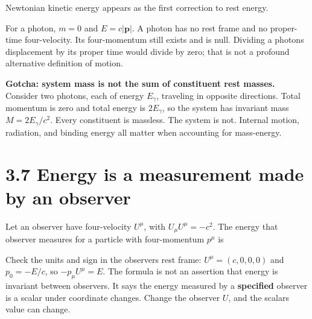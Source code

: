 \documentclass[
  11pt,
  letterpaper,
  oneside,
  openany]{scrbook}
\renewenvironment{quote}{\begin{tcolorbox}[enhanced,breakable,sharp corners,colback=pale,colframe=accent,boxrule=0pt,borderline west={2pt}{0pt}{accent},left=10pt,right=10pt,top=7pt,bottom=7pt]}{\end{tcolorbox}}
\begin{document}
\begin{center}
\begingroup
{}
\ifdim\wd\grmathbox>\linewidth
\resizebox{\linewidth}{!}{\usebox{\grmathbox}}
\else\usebox{\grmathbox}\fi
\endgroup
\end{center}

Newtonian kinetic energy appears as the first correction to rest energy.

For a photon, \(m=0\) and \(E=c|\mathbf p|\). A photon has no rest frame
and no proper-time four-velocity. Its four-momentum still exists and is
null. Dividing a photon\textquotesingle s displacement by its proper
time would divide by zero; that is not a profound alternative definition
of motion.

\begin{quote}
\textbf{Gotcha: system mass is not the sum of constituent rest masses.}
Consider two photons, each of energy \(E_\gamma\), traveling in opposite
directions. Total momentum is zero and total energy is \(2E_\gamma\), so
the system has invariant mass \(M=2E_\gamma/c^2\). Every constituent is
massless. The system is not. Internal motion, radiation, and binding
energy all matter when accounting for mass-energy.
\end{quote}

\hypertarget{energy-is-a-measurement-made-by-an-observer}{%
\section{3.7 Energy is a measurement made by an
observer}\label{energy-is-a-measurement-made-by-an-observer}}

Let an observer have four-velocity \(U^\mu\), with \(U_\mu U^\mu=-c^2\).
The energy that observer measures for a particle with four-momentum
\(p^\mu\) is

\begin{center}
\begingroup
{}
\ifdim\wd\grmathbox>\linewidth
\resizebox{\linewidth}{!}{\usebox{\grmathbox}}
\else\usebox{\grmathbox}\fi
\endgroup
\end{center}

Check the units and sign in the observer\textquotesingle s rest frame:
\(U^\mu=(c,0,0,0)\) and \(p_0=-E/c\), so \(-p_\mu U^\mu=E\). The formula
is not an assertion that energy is invariant between observers. It says
the energy measured by a \textbf{specified} observer is a scalar under
coordinate changes. Change the observer \(U\), and the
scalar\textquotesingle s value can change.
\end{document}
